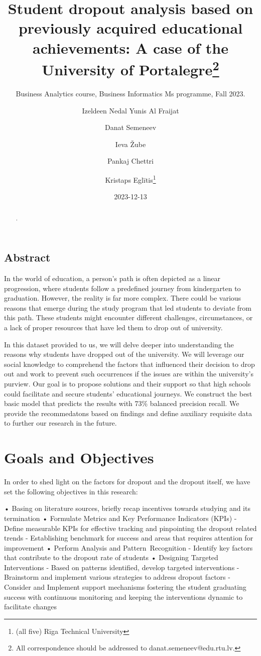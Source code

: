 \documentclass[
  letterpaper,
  DIV=11,
  numbers=noendperiod]{scrartcl}
\title{Student dropout analysis based on previously acquired educational
achievements: A case of the University of Portalegre\thanks{All
correspondence should be addressed to danat.semeneev@edu.rtu.lv.}}
\subtitle{Business Analytics course, Business Informatics Ms programme,
Fall 2023.}
\author{Izeldeen Nedal Yunis Al Fraijat \and Danat Semeneev \and Ieva
Žube \and Pankaj Chettri \and Kristaps Eglītis\footnote{(all five) Rīga
  Technical University}}
\date{2023-12-13}
\begin{document}
\maketitle
\begin{abstract}
.
\end{abstract}
\ifdefined\Shaded\renewenvironment{Shaded}{\begin{tcolorbox}[breakable, boxrule=0pt, interior hidden, enhanced, frame hidden, borderline west={3pt}{0pt}{shadecolor}, sharp corners]}{\end{tcolorbox}}\fi

\hypertarget{abstract}{%
\subsection{Abstract}\label{abstract}}

In the world of education, a person's path is often depicted as a linear
progression, where students follow a predefined journey from
kindergarten to graduation. However, the reality is far more complex.
There could be various reasons that emerge during the study program that
led students to deviate from this path. These students might encounter
different challenges, circumstances, or a lack of proper resources that
have led them to drop out of university.

In this dataset provided to us, we will delve deeper into understanding
the reasons why students have dropped out of the university. We will
leverage our social knowledge to comprehend the factors that influenced
their decision to drop out and work to prevent such occurrences if the
issues are within the university's purview. Our goal is to propose
solutions and their support so that high schools could facilitate and
secure students' educational journeys. We construct the best basic model
that predicts the results with 73\% balanced precision recall. We
provide the recommedatons based on findings and define auxiliary
requisite data to further our research in the future.

\hypertarget{goals-and-objectives}{%
\section{Goals and Objectives}\label{goals-and-objectives}}

In order to shed light on the factors for dropout and the dropout
itself, we have set the following objectives in this research:

• Basing on literature sources, briefly recap incentives towards
studying and its termination • Formulate Metrics and Key Performance
Indicators (KPIs) - Define measurable KPIs for effective tracking and
pinpointing the dropout related trends - Establishing benchmark for
success and areas that requires attention for improvement • Perform
Analysis and Pattern~Recognition - Identify key factors that contribute
to the dropout rate of students • Designing Targeted Interventions -
Based on patterns identified, develop targeted interventions -
Brainstorm and implement various strategies to address dropout factors -
Consider and Implement support mechanisms fostering the student
graduating success with continuous monitoring and keeping the
interventions dynamic to facilitate changes
\end{document}
